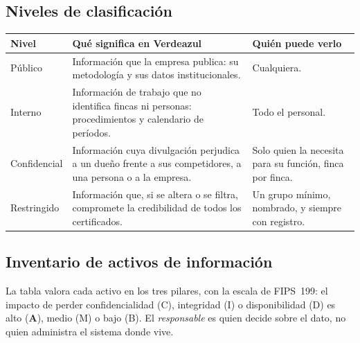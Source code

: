 \documentclass[11pt,letterpaper]{article}
\newcommand{\cab}[1]{\textbf{\rmfamily #1}}
\begin{document}
\subsection{Niveles de clasificación}

\begin{center}
\small
\renewcommand{\arraystretch}{1.16}
\begin{tabularx}{\textwidth}{@{}L{2.3cm} Y Y@{}}
\toprule
\cab{Nivel} & \cab{Qué significa en Verdeazul} & \cab{Quién puede verlo} \\
\midrule
Público & Información que la empresa publica: su metodología y sus datos institucionales. & Cualquiera. \\
Interno & Información de trabajo que no identifica fincas ni personas: procedimientos y calendario de períodos. & Todo el personal. \\
Confidencial & Información cuya divulgación perjudica a un dueño frente a sus competidores, a una persona o a la empresa. & Solo quien la necesita para su función, finca por finca. \\
Restringido & Información que, si se altera o se filtra, compromete la credibilidad de todos los certificados. & Un grupo mínimo, nombrado, y siempre con registro. \\
\bottomrule
\end{tabularx}
\end{center}

\subsection{Inventario de activos de información}

La tabla valora cada activo en los tres pilares, con la escala de FIPS~199: el impacto de perder
confidencialidad (C), integridad (I) o disponibilidad (D) es alto (\textbf{A}), medio (M) o bajo (B). El \emph{responsable}
es quien decide sobre el dato, no quien administra el sistema donde vive.
\end{document}
